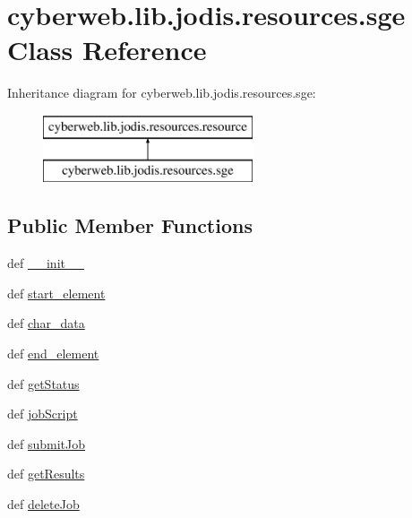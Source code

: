 \hypertarget{classcyberweb_1_1lib_1_1jodis_1_1resources_1_1sge}{\section{cyberweb.\-lib.\-jodis.\-resources.\-sge \-Class \-Reference}
\label{classcyberweb_1_1lib_1_1jodis_1_1resources_1_1sge}
}
\-Inheritance diagram for cyberweb.\-lib.\-jodis.\-resources.\-sge\-:\begin{figure}[H]
\begin{center}
\leavevmode
\includegraphics[height=2.000000cm]{classcyberweb_1_1lib_1_1jodis_1_1resources_1_1sge}
\end{center}
\end{figure}
\subsection*{\-Public \-Member \-Functions}
\begin{DoxyCompactItemize}
\item 
def \hyperlink{classcyberweb_1_1lib_1_1jodis_1_1resources_1_1sge_af2f8275a33e31aee965602d6faaa8182}{\-\_\-\-\_\-init\-\_\-\-\_\-}
\item 
def \hyperlink{classcyberweb_1_1lib_1_1jodis_1_1resources_1_1sge_a03cd5cd9870f9777f25776e9f4186016}{start\-\_\-element}
\item 
def \hyperlink{classcyberweb_1_1lib_1_1jodis_1_1resources_1_1sge_a5e200814829483b361e3dcc83bc6f6d8}{char\-\_\-data}
\item 
def \hyperlink{classcyberweb_1_1lib_1_1jodis_1_1resources_1_1sge_a518943dba438d3cda85f045555dbbbe7}{end\-\_\-element}
\item 
def \hyperlink{classcyberweb_1_1lib_1_1jodis_1_1resources_1_1sge_a9ecb86c5e63c6de108e8d4951fcc8d6f}{get\-Status}
\item 
def \hyperlink{classcyberweb_1_1lib_1_1jodis_1_1resources_1_1sge_a0689b865da521eebe7ad73ff0a5f3321}{job\-Script}
\item 
def \hyperlink{classcyberweb_1_1lib_1_1jodis_1_1resources_1_1sge_af9c990e4514c087d2a28771a2ce3adf9}{submit\-Job}
\item 
def \hyperlink{classcyberweb_1_1lib_1_1jodis_1_1resources_1_1sge_a17761d53adcb46541c9d5d7560667a1e}{get\-Results}
\item 
def \hyperlink{classcyberweb_1_1lib_1_1jodis_1_1resources_1_1sge_abff410d631596c2473086577c3ca1538}{delete\-Job}
\end{DoxyCompactItemize}
